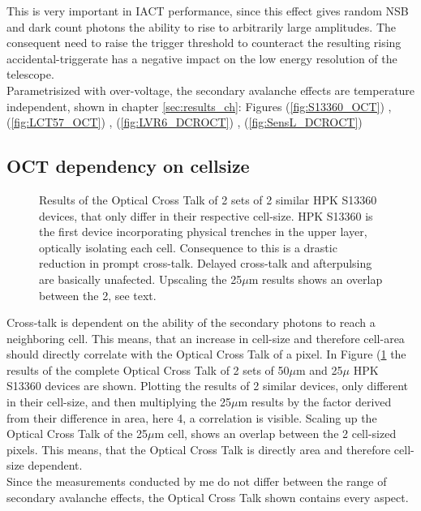 \documentclass[12pt,article,type=msc,colorback,accentcolor=tud9c]{tudthesis}
\begin{document}
This is very important in IACT performance, since this effect gives random NSB and dark count photons the ability to rise to arbitrarily large amplitudes. The consequent need to raise the trigger threshold to counteract the resulting rising accidental-triggerate has a negative impact on the low energy resolution of the telescope.\\
Parametrisized with over-voltage, the secondary avalanche effects are temperature independent, shown in chapter {\ref{sec:results_ch}}: Figures (\ref{fig:S13360_OCT}) , (\ref{fig:LCT57_OCT}) , (\ref{fig:LVR6_DCROCT}) , (\ref{fig:SensL_DCROCT})\\

\subsection{OCT dependency on cellsize}
\begin{figure}[h]
\begin{centering}
\caption{Results of the Optical Cross Talk of 2 sets of 2 similar HPK S13360 devices, that only differ in their respective cell-size. HPK S13360 is the first device incorporating physical trenches in the upper layer, optically isolating each cell. Consequence to this is a drastic reduction in prompt cross-talk. Delayed cross-talk and afterpulsing are basically unafected. Upscaling the 25$\mu$m results shows an overlap between the 2, see text.}
\label{fig:cell-size}
\end{centering}
\end{figure}
Cross-talk is dependent on the ability of the secondary photons to reach a neighboring cell. This means, that an increase in cell-size and therefore cell-area should directly correlate with the Optical Cross Talk of a pixel. In Figure (\ref{fig:cell-size} the results of the complete Optical Cross Talk of 2 sets of 50$\mu$m and 25$\mu$ HPK S13360 devices are shown. Plotting the results of 2 similar devices, only different in their cell-size, and then multiplying the 25$\mu$m results by the factor derived from their difference in area, here 4, a correlation is visible. Scaling up the Optical Cross Talk of the 25$\mu$m cell, shows an overlap between the 2 cell-sized pixels. This means, that the Optical Cross Talk is directly area and therefore cell-size dependent.\\
Since the measurements conducted by me do not differ between the range of secondary avalanche effects, the Optical Cross Talk shown contains every aspect.
\end{document}
